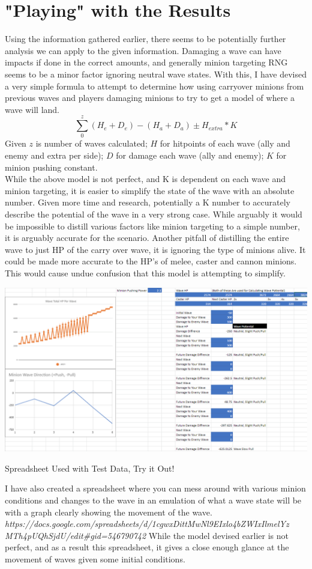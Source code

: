 \documentclass{article}
\begin{document}
\section{"Playing" with the Results}
Using the information gathered earlier, there seems to be potentially further analysis we can apply to the given information. Damaging a wave can have impacts if done in the correct amounts, and generally minion targeting RNG seems to be a minor factor ignoring neutral wave states. With this, I have devised a very simple formula to attempt to determine how using carryover minions from previous waves and players damaging minions to try to get a model of where a wave will land.\\
\begin{equation}
  \sum_{0}^{z}{(H_{e}+D_{e}) - (H_{a}+D_{a}) \pm H_{extra} * K}
\end{equation}
Given $z$ is number of waves calculated; $H$ for hitpoints of each wave (ally and enemy and extra per side); $D$ for damage each wave (ally and enemy); $K$ for minion pushing constant.\\
While the above model is not perfect, and K is dependent on each wave and minion targeting, it is easier to simplify the state of the wave with an absolute number. Given more time and research, potentially a K number to accurately describe the potential of the wave in a very strong case. While arguably it would be impossible to distill various factors like minion targeting to a simple number, it is arguably accurate for the scenario. Another pitfall of distilling the entire wave to just HP of the carry over wave, it is ignoring the type of minions alive. It could be made more accurate to the HP’s of melee, caster and cannon minions. This would cause undue confusion that this model is attempting to simplify.\\
\begin{table}[h]
\includegraphics[width=\textwidth]{WaveCalc.PNG}
\caption[Spreadsheet]{Spreadsheet Used with Test Data, Try it Out!}
\end{table}
I have also created a spreadsheet where you can mess around with various minion conditions and changes to the wave in an emulation of what a wave state will be with a graph clearly showing the movement of the wave. 
\textit{
  \\https://docs.google.com/spreadsheets/d/1cgwxDittMwNl9EIxlo4bZWIxIlmelYz\\MTh4pUQhSjdU/edit\#gid=546790742
}
While the model devised earlier is not perfect, and as a result this spreadsheet, it gives a close enough glance at the movement of waves given some initial conditions.
\end{document}
